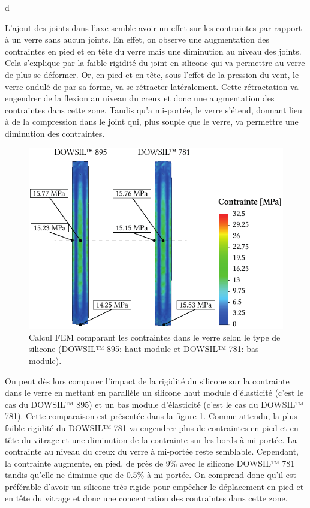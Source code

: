 \documentclass[11pt,titlepage]{article}
\begin{document}
d

L'ajout des joints dans l'axe semble avoir un effet sur les contraintes par rapport à un verre sans aucun joints. En effet, on observe une augmentation des contraintes en pied et en tête du verre mais une diminution au niveau des joints. Cela s'explique par la faible rigidité du joint en silicone qui va permettre au verre de plus se déformer. Or, en pied et en tête, sous l'effet de la pression du vent, le verre ondulé de par sa forme, va se rétracter latéralement. Cette rétractation va engendrer de la flexion au niveau du creux et donc une augmentation des contraintes dans cette zone. Tandis qu'a mi-portée, le verre s'étend, donnant lieu à de la compression dans le joint qui, plus souple que le verre, va permettre une diminution des contraintes. 
\newpage
\begin{figure}
\centering
\includegraphics[width=\linewidth]{img/ondul/fem/femjoint3.pdf}
\caption{Calcul \acrshort{FEM} comparant les contraintes dans le verre selon le type de silicone (DOWSIL™ 895: haut module et DOWSIL™ 781: bas module).}
\label{fig:femjoints3}
\vspace{-10pt}
\end{figure}

On peut dès lors comparer l'impact de la rigidité du silicone sur la contrainte dans le verre en mettant en parallèle un silicone haut module d'élasticité (c'est le cas du DOWSIL™ 895) et un bas module d'élasticité (c'est le cas du DOWSIL™ 781). Cette comparaison est présentée dans la figure \ref{fig:femjoints3}. 
Comme attendu, la plus faible rigidité du DOWSIL™ 781 va engendrer plus de contraintes en pied et en tête du vitrage et une diminution de la contrainte sur les bords à mi-portée. La contrainte au niveau du creux du verre à mi-portée reste semblable. Cependant, la contrainte augmente, en pied, de près de 9\% avec le silicone DOWSIL™ 781 tandis qu'elle ne diminue que de 0.5\% à mi-portée. On comprend donc qu'il est préférable d'avoir un silicone très rigide pour empêcher le déplacement en pied et en tête du vitrage et donc une concentration des contraintes dans cette zone.
\end{document}

